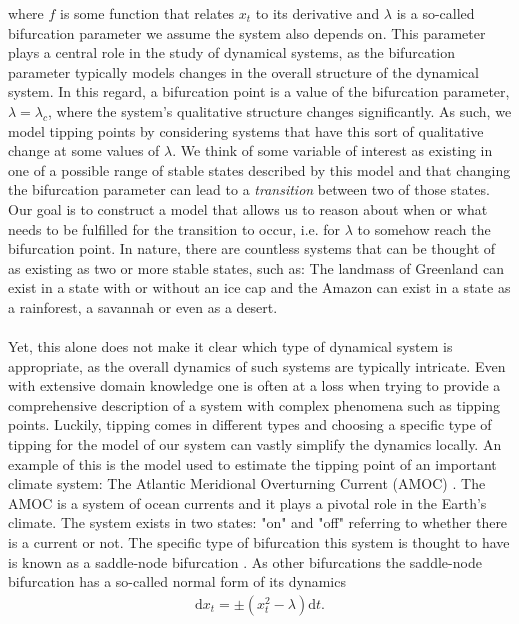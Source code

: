 where $f$ is some function that relates $x_t$ to its derivative and $\lambda$ is a so-called bifurcation parameter we assume the system also depends on. This parameter plays a central role in the study of dynamical systems, as the bifurcation parameter typically models changes in the overall structure of the dynamical system. In this regard, a bifurcation point is a value of the bifurcation parameter, $\lambda = \lambda_c$, where the system's qualitative structure changes significantly. As such, we model tipping points by considering systems that have this sort of qualitative change at some values of $\lambda$. We think of some variable of interest as existing in one of a possible range of stable states described by this model and that changing the bifurcation parameter can lead to a \textit{transition} between two of those states. Our goal is to construct a model that allows us to reason about when or what needs to be fulfilled for the transition to occur, i.e. for $\lambda$ to somehow reach the bifurcation point. In nature, there are countless systems that can be thought of as existing as two or more stable states, such as: The landmass of Greenland can exist in a state with or without an ice cap and the Amazon can exist in a state as a rainforest, a savannah or even as a desert. \\\\
Yet, this alone does not make it clear which type of dynamical system is appropriate, as the overall dynamics of such systems are typically intricate. Even with extensive domain knowledge one is often at a loss when trying to provide a comprehensive description of a system with complex phenomena such as tipping points. Luckily, tipping comes in different types and choosing a specific type of tipping for the model of our system can vastly simplify the dynamics locally. An example of this is the model used to estimate the tipping point of an important climate system: The Atlantic Meridional Overturning Current (AMOC) \cite{Ditlevsen2023}. The AMOC is a system of ocean currents and it plays a pivotal role in the Earth's climate. The system exists in two states: "on" and "off" referring to whether there is a current or not. The specific type of bifurcation this system is thought to have is known as a saddle-node bifurcation \cite{Ditlevsen2023}\cite{Strogatz2019_gv}. As other bifurcations the saddle-node bifurcation has a so-called normal form of its dynamics 
\begin{align}
    \mathrm{d}x_t = \pm\left(x_t^2 - \lambda\right)\mathrm{d}t. \label{eq:normalFormIntroduction}
\end{align}
